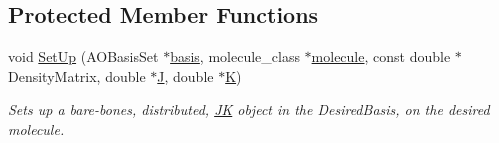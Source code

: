 \subsection*{Protected Member Functions}
\begin{DoxyCompactItemize}
\item 
void \hyperlink{classJKBuilder_1_1JK_a13b685265e196c183897777ec2f3136a}{SetUp} (AOBasisSet $\ast$\hyperlink{classJKBuilder_1_1JK_a81392b84b45d3cf84c5c105e9fd5d09c}{basis}, molecule\_\-class $\ast$\hyperlink{classJKBuilder_1_1JK_ad646bdee4fc9f601f954b4a98c4da476}{molecule}, const double $\ast$DensityMatrix, double $\ast$\hyperlink{classJKBuilder_1_1JK_aa04a91cc219b5dabfce19d5316f96887}{J}, double $\ast$\hyperlink{classJKBuilder_1_1JK_a5160b673d25f0110d98097f8e7364315}{K})
\begin{DoxyCompactList}\small\item\em Sets up a bare-\/bones, distributed, \hyperlink{classJKBuilder_1_1JK}{JK} object in the DesiredBasis, on the desired molecule. \item\end{DoxyCompactList}\end{DoxyCompactItemize}
